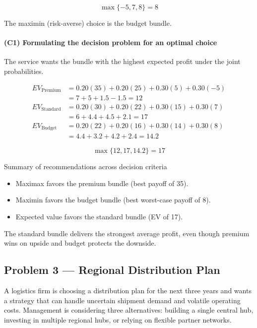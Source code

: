\[
\max\{-5, 7, 8\} = 8
\]

The maximin (risk-averse) choice is the budget bundle.

\paragraph{(C1) Formulating the decision problem for an optimal choice}\label{subsubsec:practice-activity-2-solution-2-c1}

The service wants the bundle with the highest expected profit under the joint probabilities.

\[
\begin{aligned}
EV_{\text{Premium}} &= 0.20(35) + 0.20(25) + 0.30(5) + 0.30(-5) \\
&= 7 + 5 + 1.5 - 1.5 = 12 \\
EV_{\text{Standard}} &= 0.20(30) + 0.20(22) + 0.30(15) + 0.30(7) \\
&= 6 + 4.4 + 4.5 + 2.1 = 17 \\
EV_{\text{Budget}} &= 0.20(22) + 0.20(16) + 0.30(14) + 0.30(8) \\
&= 4.4 + 3.2 + 4.2 + 2.4 = 14.2
\end{aligned}
\]

\[
\max\{12, 17, 14.2\} = 17
\]

Summary of recommendations across decision criteria

\begin{itemize}
	\item Maximax favors the premium bundle (best payoff of 35).
	\item Maximin favors the budget bundle (best worst-case payoff of 8).
	\item Expected value favors the standard bundle (EV of 17).
\end{itemize}

The standard bundle delivers the strongest average profit, even though premium wins on upside and budget protects the downside.

\subsection{Problem 3 --- Regional Distribution Plan}\label{subsec:practice-activity-2-problem-3}

A logistics firm is choosing a distribution plan for the next three years and wants a strategy that can handle uncertain
shipment demand and volatile operating costs. Management is considering three alternatives: building a single central hub,
investing in multiple regional hubs, or relying on flexible partner networks.

